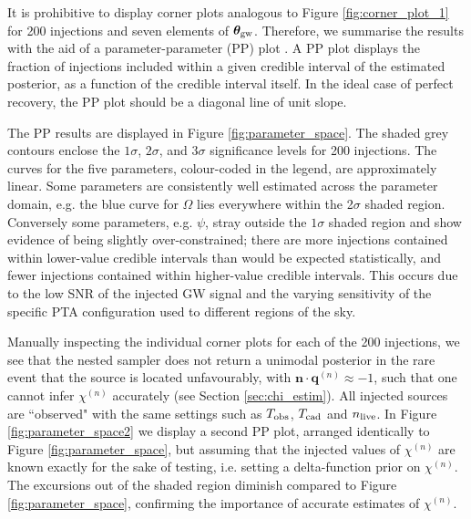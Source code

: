\documentclass[fleqn,usenatbib,useAMS]{mnras}
\begin{document}
It is prohibitive to display corner plots analogous to Figure \ref{fig:corner_plot_1} for 200 injections and seven elements of $\boldsymbol{\theta}_{\rm gw}$. Therefore, we summarise the results with the aid of a parameter-parameter (PP) plot \citep{doi:10.1198/106186006X136976}. A PP plot displays the fraction of injections included within a given credible interval of the estimated posterior, as a function of the credible interval itself. In the ideal case of perfect recovery, the PP plot should be a diagonal line of unit slope. \newline 
 
The PP results are displayed in Figure \ref{fig:parameter_space}. The shaded grey contours enclose the $1\sigma$, $2\sigma$, and $3\sigma$ significance levels for 200 injections. The curves for the five parameters, colour-coded in the legend, are approximately linear. Some parameters are consistently well estimated across the parameter domain, e.g. the blue curve for $\Omega$ lies everywhere within the 2$\sigma$ shaded region. Conversely some parameters, e.g. $\psi$, stray outside the $1\sigma$ shaded region and show evidence of being slightly over-constrained; there are more injections contained within lower-value credible intervals than would be expected statistically, and fewer injections contained within higher-value credible intervals. This occurs due to the low SNR of the injected GW signal and the varying sensitivity of the specific PTA configuration used to different regions of the sky. \newline 

Manually inspecting the individual corner plots for each of the 200 injections, we see that the nested sampler does not return a unimodal posterior in the rare event that the source is located unfavourably, with $\boldsymbol{n} \cdot \boldsymbol{q}^{(n)} \approx -1$, such that one cannot infer $\chi^{(n)}$ accurately (see Section \ref{sec:chi_estim}). All injected sources are ``observed" with the same settings such as $T_{\rm obs}$, $T_{\rm cad}$ and $n_{\rm live}$. In Figure \ref{fig:parameter_space2} we display a second PP plot, arranged identically to Figure \ref{fig:parameter_space}, but assuming that the injected values of $\chi^{(n)}$ are known exactly for the sake of testing, i.e. setting a delta-function prior on $\chi^{(n)}$. The excursions out of the shaded region diminish compared to Figure \ref{fig:parameter_space}, confirming the importance of accurate estimates of $\chi^{(n)}$. 
	
	
\end{document}
